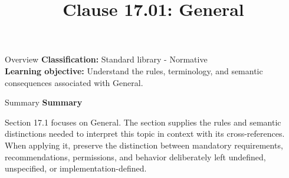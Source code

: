 \documentclass[10pt,letterpaper]{article}
\title{Clause 17.01: General}
\author{}
\date{}
\begin{document}
\maketitle
\begin{CornellOverviewBox}{Overview}
\textbf{Classification:} Standard library - Normative\\[2pt]
\textbf{Learning objective:} Understand the rules, terminology, and semantic consequences associated with General.
\end{CornellOverviewBox}\begin{CornellSummaryBox}{Summary}
{\sffamily\bfseries\color{Accent} Summary}\par\vspace{3pt}Section 17.1 focuses on General. The section supplies the rules and semantic distinctions needed to interpret this topic in context with its cross-references. When applying it, preserve the distinction between mandatory requirements, recommendations, permissions, and behavior deliberately left undefined, unspecified, or implementation-defined.
\end{CornellSummaryBox}
\end{document}
